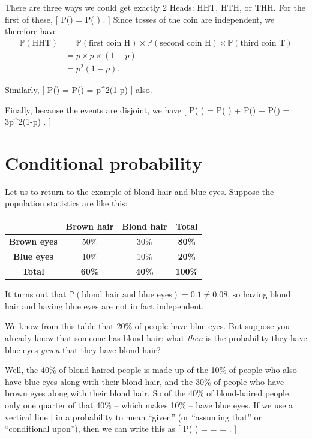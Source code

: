 \documentclass[
  letterpaper,
]{report}
\theoremstyle{definition}
\theoremstyle{definition}
\theoremstyle{remark}
\begin{document}
There are three ways we could get exactly 2 Heads: HHT, HTH, or THH. For
the first of these, {[} \mathbb P() =
\mathbb P( \cap {}
\cap {}) . {]} Since tosses of the coin are
independent, we therefore have \begin{align*}
\mathbb P(\text{HHT})
  &= \mathbb P(\text{first coin H}) \times \mathbb P ( \text{second coin H} )\times \mathbb P(\text{third coin T}) \\
  &=p \times p \times (1-p) \\
  &= p^2(1-p).
\end{align*}

Similarly, {[} \mathbb P() = \mathbb P() =
p\^{}2(1-p) {]} also.

Finally, because the events are disjoint, we have {[}
\mathbb P( \cup{} \cup {}) =
\mathbb P( ) + \mathbb P() + \mathbb P() =
3p\^{}2(1-p) . {]}

\hypertarget{conditional}{%
\section{Conditional probability}\label{conditional}}

Let us to return to the example of blond hair and blue eyes. Suppose the
population statistics are like this:

\begin{longtable}[]{@{}cccc@{}}
\toprule()
& \textbf{Brown hair} & \textbf{Blond hair} & \textbf{Total} \\
\midrule()
\endhead
\textbf{Brown eyes} & 50\% & 30\% & \textbf{80\%} \\
\textbf{Blue eyes} & 10\% & 10\% & \textbf{20\%} \\
\textbf{Total} & \textbf{60\%} & \textbf{40\%} & \textbf{100\%} \\
\bottomrule()
\end{longtable}

It turns out that
\(\mathbb P(\text{blond hair and blue eyes}) = 0.1 \neq 0.08\), so
having blond hair and having blue eyes are not in fact independent.

We know from this table that 20\% of people have blue eyes. But suppose
you already know that someone has blond hair: what \emph{then} is the
probability they have blue eyes \emph{given} that they have blond hair?

Well, the 40\% of blond-haired people is made up of the 10\% of people
who also have blue eyes along with their blond hair, and the 30\% of
people who have brown eyes along with their blond hair. So of the 40\%
of blond-haired people, only one quarter of that 40\% -- which makes
10\% -- have blue eyes. If we use a vertical line \(|\) in a probability
to mean ``given'' (or ``assuming that'' or ``conditional upon''), then
we can write this as {[} \mathbb P(
\mid {}) =
=  = . {]}
\end{document}
